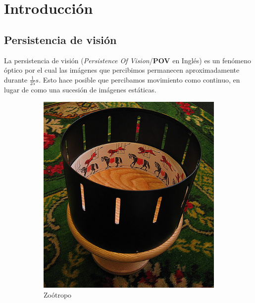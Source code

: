 \section{Introducción}
\subsection{Persistencia de visión}
La persistencia de visión (\textsl{Persistence Of Vision}/\textbf{POV} en
Inglés) es un fenómeno óptico por el cual las imágenes que percibimos permanecen
aproximadamente durante $\frac{1}{25}s$. Esto hace posible que percibamos
movimiento como continuo, en lugar de como una sucesión de imágenes estáticas.

\begin{figure}[!ht]
	\centering
	\begin{subfigure}[t]{0.4\textwidth}
		\centering
		\includegraphics[width=\textwidth]{images/Zootropo}
		\caption{Zoótropo}
	\end{subfigure}
	\hspace{0.5cm}
	\begin{subfigure}[t]{0.4\textwidth}
		\centering

\end{subfigure}
\end{figure}
